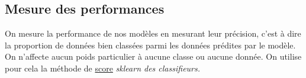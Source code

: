 \subsection{Mesure des performances}

On mesure la performance de nos modèles en mesurant leur précision, c'est à dire la proportion de données bien classées parmi les données prédites par le modèle. On n'affecte aucun poids particulier à aucune classe ou aucune donnée. On utilise pour cela la méthode de \href{https://scikit-learn.org/stable/modules/generated/sklearn.base.ClassifierMixin.html#sklearn.base.ClassifierMixin.score}{score} \it{sklearn} des classifieurs.